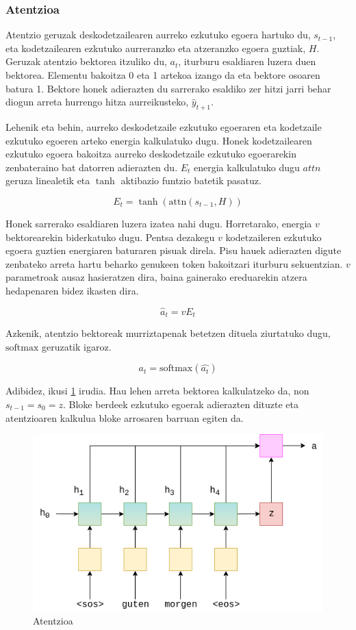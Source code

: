 \documentclass[11pt,a4paper]{article}
\begin{document}
\subsubsection{Atentzioa}

Atentzio geruzak deskodetzailearen aurreko ezkutuko egoera hartuko du, $s_{t-1}$, eta kodetzailearen ezkutuko aurreranzko eta atzeranzko egoera guztiak, $H$. Geruzak atentzio bektorea itzuliko du, $a_t$, iturburu esaldiaren luzera duen bektorea. Elementu bakoitza 0 eta 1 artekoa izango da eta bektore osoaren batura 1. Bektore honek adierazten du sarrerako esaldiko zer hitzi jarri behar diogun arreta hurrengo hitza aurreikusteko, $\hat{y}_{t+1}$.

Lehenik eta behin, aurreko deskodetzaile ezkutuko egoeraren eta kodetzaile ezkutuko egoeren arteko energia kalkulatuko dugu. Honek kodetzailearen ezkutuko egoera bakoitza aurreko deskodetzaile ezkutuko egoerarekin zenbateraino bat datorren adierazten du. $E_t$ energia kalkulatuko dugu $attn$ geruza linealetik eta $\tanh$ aktibazio funtzio batetik pasatuz.

$$E_t = \tanh(\text{attn}(s_{t-1}, H))$$ 

Honek sarrerako esaldiaren luzera izatea nahi dugu. Horretarako, energia $v$ bektorearekin biderkatuko dugu. Pentsa dezakegu $v$ kodetzaileren ezkutuko egoera guztien energiaren baturaren pisuak direla. Pisu hauek adierazten digute zenbateko arreta hartu beharko genukeen token bakoitzari iturburu sekuentzian. $v$ parametroak ausaz hasieratzen dira, baina gainerako ereduarekin atzera hedapenaren bidez ikasten dira.

$$\hat{a}_t = v E_t$$

Azkenik, atentzio bektoreak murriztapenak betetzen dituela ziurtatuko dugu, $ \text{softmax}$ geruzatik igaroz.

$$a_t = \text{softmax}(\hat{a_t})$$

Adibidez, ikusi \ref{fig:attention} irudia. Hau lehen arreta bektorea kalkulatzeko da, non $s_{t-1} = s_0 = z$. Bloke berdeek ezkutuko egoerak adierazten dituzte eta atentzioaren kalkulua bloke arrosaren barruan egiten da.

\begin{figure}[ht]
    \centering
    \includegraphics[width=\linewidth]{attention}
    \caption{Atentzioa}
    \label{fig:attention}
\end{figure}
\end{document}
